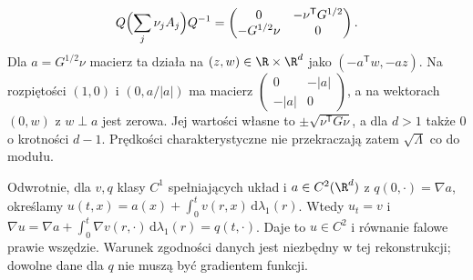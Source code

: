 \begin{uwaga}
\[
 Q\Bigl(\sum_j\nu_jA_j\Bigr)Q^{-1}
 =\begin{pmatrix}0&-\nu^\mathsf TG^{1/2}\\
                  -G^{1/2}\nu&0\end{pmatrix}.
\]
Dla $a=G^{1/2}\nu$ macierz ta działa na
$(z,w)\in\R\times\R^d$ jako $(-a^\mathsf Tw,-az)$.
Na rozpiętości $(1,0)$ i $(0,a/|a|)$ ma macierz
$\begin{pmatrix}0&-|a|\\-|a|&0\end{pmatrix}$,
a na wektorach $(0,w)$ z $w\perp a$ jest zerowa.
Jej wartości własne to $\pm\sqrt{\nu^\mathsf TG\nu}$,
a dla $d>1$ także $0$ o krotności $d-1$. Prędkości charakterystyczne
nie przekraczają zatem $\sqrt{\Lambda}$ co do modułu.

Odwrotnie, dla $v,q$ klasy $C^1$ spełniających układ
i $a\in C^2(\R^d)$ z $q(0,\cdot)=\nabla a$, określamy
$u(t,x)=a(x)+\int_0^t v(r,x)\,\mathrm d\lambda_1(r)$.
Wtedy $u_t=v$ i
$\nabla u=\nabla a+\int_0^t\nabla v(r,\cdot)\,
\mathrm d\lambda_1(r)=q(t,\cdot)$.
Daje to $u\in C^2$ i równanie falowe prawie wszędzie.
Warunek zgodności danych jest niezbędny w tej
rekonstrukcji; dowolne dane dla $q$ nie muszą
być gradientem funkcji.
\end{uwaga}

